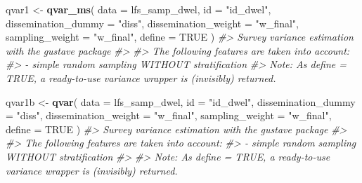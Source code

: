 \documentclass[
]{article}
\newenvironment{Shaded}{\begin{snugshade}}{\end{snugshade}}
\newcommand{\AttributeTok}[1]{\textcolor[rgb]{0.13,0.29,0.53}{#1}}
\newcommand{\CommentTok}[1]{\textcolor[rgb]{0.56,0.35,0.01}{\textit{#1}}}
\newcommand{\ConstantTok}[1]{\textcolor[rgb]{0.56,0.35,0.01}{#1}}
\newcommand{\DecValTok}[1]{\textcolor[rgb]{0.00,0.00,0.81}{#1}}
\newcommand{\FunctionTok}[1]{\textcolor[rgb]{0.13,0.29,0.53}{\textbf{#1}}}
\newcommand{\NormalTok}[1]{#1}
\newcommand{\OtherTok}[1]{\textcolor[rgb]{0.56,0.35,0.01}{#1}}
\newcommand{\SpecialCharTok}[1]{\textcolor[rgb]{0.81,0.36,0.00}{\textbf{#1}}}
\newcommand{\StringTok}[1]{\textcolor[rgb]{0.31,0.60,0.02}{#1}}
\begin{document}
\begin{Shaded}
\end{Shaded}

\begin{Shaded}
\begin{Highlighting}[]
\NormalTok{qvar1 }\OtherTok{\textless{}{-}} \FunctionTok{qvar\_ms}\NormalTok{(}
  \AttributeTok{data =}\NormalTok{ lfs\_samp\_dwel,}
  \AttributeTok{id =} \StringTok{"id\_dwel"}\NormalTok{,}
  \AttributeTok{dissemination\_dummy =} \StringTok{"diss"}\NormalTok{,}
  \AttributeTok{dissemination\_weight =} \StringTok{"w\_final"}\NormalTok{,}
  \AttributeTok{sampling\_weight =} \StringTok{"w\_final"}\NormalTok{,}
  \AttributeTok{define =} \ConstantTok{TRUE}
\NormalTok{)}
\CommentTok{\#\textgreater{} Survey variance estimation with the gustave package}
\CommentTok{\#\textgreater{} }
\CommentTok{\#\textgreater{} The following features are taken into account:}
\CommentTok{\#\textgreater{}   {-} simple random sampling WITHOUT stratification}
\CommentTok{\#\textgreater{} Note: As define = TRUE, a ready{-}to{-}use variance wrapper is (invisibly) returned.}

\NormalTok{qvar1b }\OtherTok{\textless{}{-}} \FunctionTok{qvar}\NormalTok{(}
  \AttributeTok{data =}\NormalTok{ lfs\_samp\_dwel,}
  \AttributeTok{id =} \StringTok{"id\_dwel"}\NormalTok{,}
  \AttributeTok{dissemination\_dummy =} \StringTok{"diss"}\NormalTok{,}
  \AttributeTok{dissemination\_weight =} \StringTok{"w\_final"}\NormalTok{,}
  \AttributeTok{sampling\_weight =} \StringTok{"w\_final"}\NormalTok{,}
  \AttributeTok{define =} \ConstantTok{TRUE}
\NormalTok{)}
\CommentTok{\#\textgreater{} Survey variance estimation with the gustave package}
\CommentTok{\#\textgreater{} }
\CommentTok{\#\textgreater{} The following features are taken into account:}
\CommentTok{\#\textgreater{}   {-} simple random sampling WITHOUT stratification}
\CommentTok{\#\textgreater{} }
\CommentTok{\#\textgreater{} Note: As define = TRUE, a ready{-}to{-}use variance wrapper is (invisibly) returned.}


\end{Highlighting}
\end{Shaded}
\end{document}

